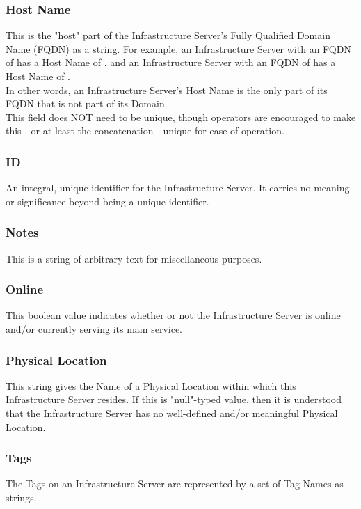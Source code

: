 \subsubsection{Host Name}
This is the "host" part of the Infrastructure Server's Fully Qualified Domain
Name (FQDN) as a string. For example, an Infrastructure Server with an FQDN of
 has a Host Name of , and an Infrastructure
Server with an FQDN of  has a Host Name of
.\\
In other words, an Infrastructure Server's Host Name is the only part of its
FQDN that is not part of its Domain.\\
This field does NOT need to be unique, though operators are encouraged to make
this - or at least the concatenation  -
unique for ease of operation.

\subsubsection{ID}
An integral, unique identifier for the Infrastructure Server. It carries no
meaning or significance beyond being a unique identifier.

\subsubsection{Notes}
This is a string of arbitrary text for miscellaneous purposes.

\subsubsection{Online}
This boolean value indicates whether or not the Infrastructure Server is online
and/or currently serving its main service.

\subsubsection{Physical Location}
This string gives the Name of a Physical Location within which this
Infrastructure Server resides. If this is "null"-typed value, then it is
understood that the Infrastructure Server has no well-defined and/or
meaningful Physical Location.

\subsubsection{Tags}
The Tags on an Infrastructure Server are represented by a set of Tag Names as
strings.

